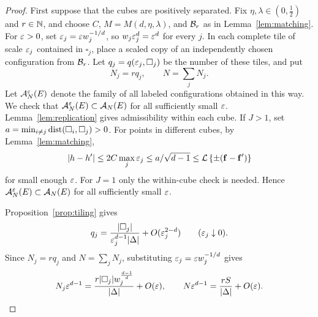 \documentclass[11pt,letterpaper]{article}
\begin{document}
\begin{proof}
      First suppose that the cubes are positively separated. Fix $\eta,\lambda\in(0,\frac12)$ and $r\in\mathbb N$, and choose $C$, $M=M(d,\eta,\lambda)$, and $\mathcal B_r$ as in Lemma~\ref{lem:matching}. For $\varepsilon>0$, set $\varepsilon_j=\varepsilon w_j^{-1/d}$, so $w_j\varepsilon_j^d=\varepsilon^d$ for every $j$. In each complete tile of scale $\varepsilon_j$ contained in $\square_j$, place a scaled copy of an independently chosen configuration from $\mathcal B_r$. Let $q_j=q(\varepsilon_j,\square_j)$ be the number of these tiles, and put
      \[
            N_j=rq_j,\qquad N=\sum_jN_j.
      \]
      Let $\mathcal A_N^\varepsilon(E)$ denote the family of all labeled configurations obtained in this way. We check that $\mathcal A_N^\varepsilon(E)\subset\mathcal A_N(E)$ for all sufficiently small $\varepsilon$. Lemma~\ref{lem:replication} gives admissibility within each cube. If $J>1$, set $a=\min_{i\ne j}\operatorname{dist}(\square_i,\square_j)>0$. For points in different cubes, by Lemma~\ref{lem:matching},
      \[
            |h-h'|\le2C\max_j\varepsilon_j\le a/\sqrt{d-1}
            \le\mathcal L\left\{\pm(\mathbf f-\mathbf f')\right\}
      \]
      for small enough $\varepsilon$. For $J=1$ only the within-cube check is needed. Hence $\mathcal A_N^\varepsilon(E)\subset\mathcal A_N(E)$ for all sufficiently small $\varepsilon$.

      Proposition~\ref{prop:tiling} gives
      \begin{equation}\label{eq:qj_asymptotics}
            q_j=\frac{|\square_j|}{\varepsilon_j^{d-1}|\Delta|}+O(\varepsilon_j^{2-d})
            \qquad(\varepsilon_j\downarrow0).
      \end{equation}
      Since $N_j=rq_j$ and $N=\sum_jN_j$, substituting $\varepsilon_j=\varepsilon w_j^{-1/d}$ gives
      \begin{equation}\label{eq:N_Nj_asymptotics}
            N_j\varepsilon^{d-1}=\frac{r|\square_j|w_j^{\frac{d-1}{d}}}{|\Delta|}+O(\varepsilon),
            \qquad
            N\varepsilon^{d-1}=\frac{rS}{|\Delta|}+O(\varepsilon).
      \end{equation}


\end{proof}
\end{document}
